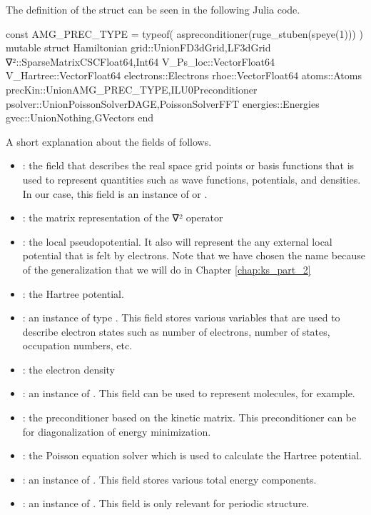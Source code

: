 The definition of the  struct can be seen in the following
Julia code.
\begin{fullwidth}
\begin{juliacode}
const AMG_PREC_TYPE = typeof( aspreconditioner(ruge_stuben(speye(1))) )
mutable struct Hamiltonian
    grid::Union{FD3dGrid,LF3dGrid}
    ∇²::SparseMatrixCSC{Float64,Int64}
    V_Ps_loc::Vector{Float64}
    V_Hartree::Vector{Float64}
    electrons::Electrons
    rhoe::Vector{Float64}
    atoms::Atoms
    precKin::Union{AMG_PREC_TYPE,ILU0Preconditioner}
    psolver::Union{PoissonSolverDAGE,PoissonSolverFFT}
    energies::Energies
    gvec::Union{Nothing,GVectors}
end
\end{juliacode}
\end{fullwidth}
%
A short explanation about the fields of  follows.
\begin{itemize}
%
  \item {}: the field that describes the real space grid points or
basis functions that is used to represent quantities such as wave functions,
potentials, and densities. In our case, this field is an instance of
 or .
%
\item {}: the matrix representation of the ∇² operator
%
\item {}: the local pseudopotential. It also will represent the
any external local potential that is felt by electrons.
Note that we have chosen the name  because of the
generalization that we will do in Chapter \ref{chap:ks_part_2}
%
\item {}: the Hartree potential.
%
\item {}: an instance of type . This field
stores various variables that are used to describe electron states such as number
of electrons, number of states, occupation numbers, etc.
%
\item {}: the electron density
%
\item {}: an instance of . This field can be used to represent
molecules, for example.
%
\item {}: the preconditioner based on the kinetic matrix. This preconditioner
can be for diagonalization of energy minimization.
%
\item {}: the Poisson equation solver which is used to calculate the Hartree
potential.
%
\item {}: an instance of . This field stores
various total energy components.
%
\item {}: an instance of . This field is only relevant for
periodic structure.
%
\end{itemize}


